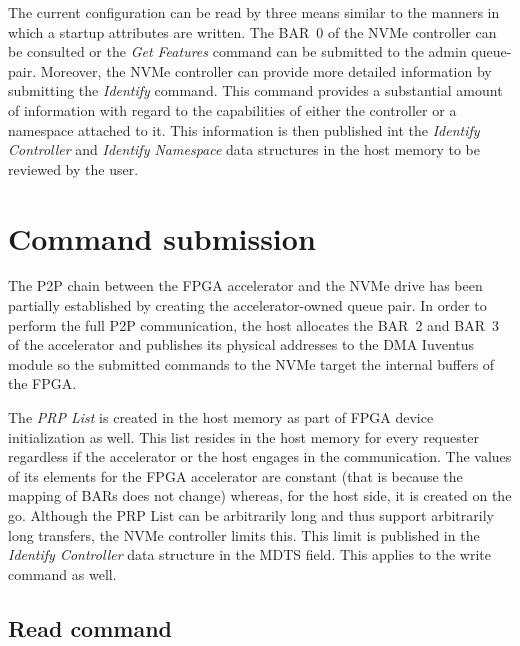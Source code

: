 The current configuration can be read by three means similar to the manners in which a startup
attributes are written. The BAR~0 of the NVMe controller can be consulted or the \emph{Get Features}
command can be submitted to the admin queue-pair. Moreover, the NVMe controller can provide more
detailed information by submitting the \emph{Identify} command. This command provides a substantial
amount of information with regard to the capabilities of either the controller or a namespace
attached to it. This information is then published int the \emph{Identify Controller} and
\emph{Identify Namespace} data structures in the host memory to be reviewed by the
user\cite{nvme_spec}.


\section{Command submission}

The P2P chain between the FPGA accelerator and the NVMe drive has been partially established by
creating the accelerator-owned queue pair. In order to perform the full P2P communication, the host
allocates the BAR~2 and BAR~3 of the accelerator and publishes its physical addresses to the
DMA Iuventus module so the submitted commands to the NVMe target the internal buffers of the FPGA.

The \emph{PRP List} is created in the host memory as part of FPGA device initialization as well.
This list resides in the host memory for every requester regardless if the accelerator or the host
engages in the communication. The values of its elements for the FPGA accelerator are constant (that
is because the mapping of BARs does not change) whereas, for the host side, it is created on the
go\footnotemark. Although the PRP List can be arbitrarily long and thus support arbitrarily long transfers,
the NVMe controller limits this. This limit is
published in the \emph{Identify Controller} data structure in the \ac{MDTS} field. This applies to
the write command as well.


\subsection{Read command}

